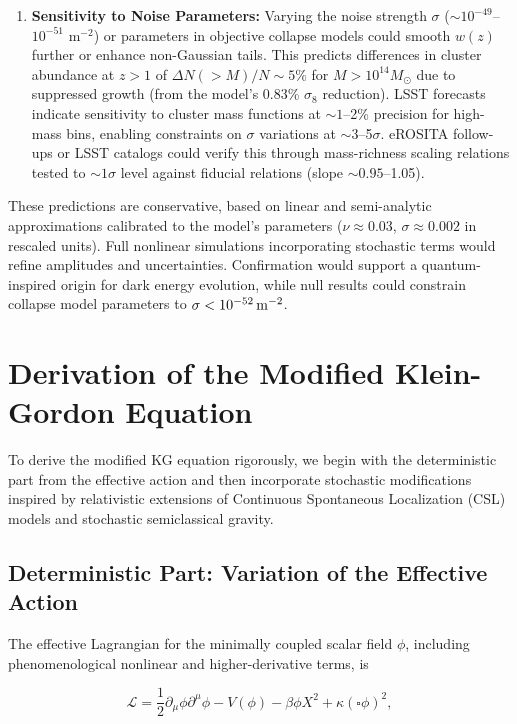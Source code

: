 \documentclass[preprint]{aastex7}
\begin{document}
\begin{enumerate}
\item \textbf{Sensitivity to Noise Parameters:}  
Varying the noise strength \( \sigma \) (\( \sim 10^{-49} \)--$10^{-51}$ m\( ^{-2} \)) or parameters in objective collapse models could smooth \( w(z) \) further or enhance non-Gaussian tails. This predicts differences in cluster abundance at \( z > 1 \) of \( \Delta N(> M)/N \sim 5\% \) for \( M > 10^{14} M_\odot \) due to suppressed growth (from the model's 0.83\% \( \sigma_8 \) reduction). LSST forecasts indicate sensitivity to cluster mass functions at \( \sim 1 \)--2\% precision for high-mass bins, enabling constraints on \( \sigma \) variations at \( \sim 3 \)--5\( \sigma \). eROSITA follow-ups or LSST catalogs could verify this through mass-richness scaling relations tested to \( \sim 1\sigma \) level against fiducial relations (slope \( \sim 0.95 \)--1.05).
\end{enumerate}

These predictions are conservative, based on linear and semi-analytic approximations calibrated to the model's parameters (\( \nu \approx 0.03 \), \( \sigma \approx 0.002 \) in rescaled units). Full nonlinear simulations incorporating stochastic terms would refine amplitudes and uncertainties. Confirmation would support a quantum-inspired origin for dark energy evolution, while null results could constrain collapse model parameters to \( \sigma < 10^{-52} \, {\rm m}^{-2} \).

\appendix

\section{Derivation of the Modified Klein-Gordon Equation}

To derive the modified KG equation rigorously, we begin with the deterministic part from the effective action and then incorporate stochastic modifications inspired by relativistic extensions of Continuous Spontaneous Localization (CSL) models and stochastic semiclassical gravity.

\subsection{Deterministic Part: Variation of the Effective Action}

The effective Lagrangian for the minimally coupled scalar field \( \phi \), including phenomenological nonlinear and higher-derivative terms, is

\begin{equation}
\mathcal{L} = \frac{1}{2} \partial_\mu \phi \partial^\mu \phi - V(\phi) - \beta \phi X^2 + \kappa (\square \phi)^2,
\end{equation}
\end{document}
